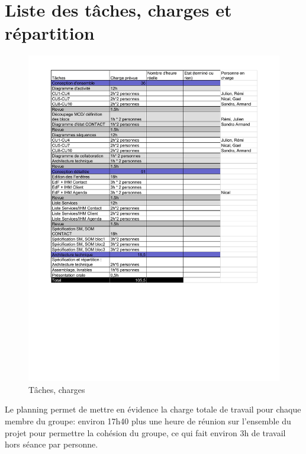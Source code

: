 \section{Liste des tâches, charges et répartition}
\begin{figure}[H]
	\begin{center}
		\includegraphics[scale=0.7]{SuiviTache.pdf}
		\caption{Tâches, charges}
	\end{center}
\end{figure}

Le planning permet de mettre en évidence la charge totale de travail pour chaque membre du groupe: environ 17h40 plus une heure de réunion sur l'ensemble du projet pour permettre la cohésion du groupe, ce qui fait environ 3h de travail hors séance par personne.

